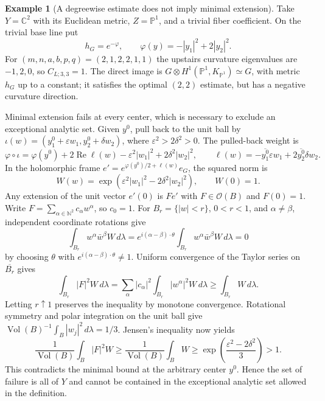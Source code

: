 \documentclass[11pt,reqno]{amsart}
\numberwithin{equation}{section}
\theoremstyle{definition}
\newtheorem{example}[theorem]{Example}
\theoremstyle{remark}
\begin{document}
\begin{example}[A degreewise estimate does not imply minimal extension]
\label{ex:trace-not-mep}
Take $Y=\mathbb C^2$ with its Euclidean metric,
$Z=\mathbb P^1$, and a trivial fiber coefficient.  On the trivial
base line put
\[
 h_G=e^{-\varphi},\qquad
 \varphi(y)=-|y_1|^2+2|y_2|^2.
\]
For $(m,n,a,b,p,q)=(2,1,2,2,1,1)$ the upstairs curvature
eigenvalues are $-1,2,0$, so $C_{L;3,3}=1$.
The direct image is
$G\otimes H^1(\mathbb P^1,K_{\mathbb P^1})\simeq G$,
with metric $h_G$ up to a constant; it satisfies the optimal
$(2,2)$ estimate, but has a negative curvature direction.

Minimal extension fails at every center, which is necessary to
exclude an exceptional analytic set.  Given $y^0$, pull back to
the unit ball by
$\iota(w)=(y^0_1+\varepsilon w_1,y^0_2+\delta w_2)$,
where $\varepsilon^2>2\delta^2>0$.
The pulled-back weight is
\[
 \varphi\circ\iota=\varphi(y^0)+2\operatorname{Re}\ell(w)
        -\varepsilon^2|w_1|^2+2\delta^2|w_2|^2,
 \qquad
 \ell(w)=-\overline{y^0_1}\varepsilon w_1
                      +2\overline{y^0_2}\delta w_2.
\]
In the holomorphic frame
$e'=e^{\varphi(y^0)/2+\ell(w)}e_G$, the squared norm is
\[
 W(w)=\exp(\varepsilon^2|w_1|^2-2\delta^2|w_2|^2),\qquad W(0)=1.
\]
Any extension of the unit vector $e'(0)$ is $F e'$ with
$F\in\mathcal O(B)$ and $F(0)=1$.  Write
$F=\sum_{\alpha\in\mathbb N^2}c_\alpha w^\alpha$, so $c_0=1$.
For $B_r=\{|w|<r\}$, $0<r<1$, and $\alpha\ne\beta$,
independent coordinate rotations give
\[
 \int_{B_r}w^\alpha\bar w^\beta W\,d\lambda
   =e^{i(\alpha-\beta)\cdot\theta}
           \int_{B_r}w^\alpha\bar w^\beta W\,d\lambda=0
\]
by choosing $\theta$ with $e^{i(\alpha-\beta)\cdot\theta}\ne1$.
Uniform convergence of the Taylor series on $\overline{B_r}$ gives
\[
 \int_{B_r}|F|^2W\,d\lambda
   =\sum_\alpha|c_\alpha|^2\int_{B_r}|w^\alpha|^2W\,d\lambda
   \ge\int_{B_r}W\,d\lambda.
\]
Letting $r\uparrow1$ preserves the inequality by monotone convergence.
Rotational symmetry and polar integration on the unit ball give
$\operatorname{Vol}(B)^{-1}\int_B|w_j|^2\,d\lambda=1/3$.
Jensen's inequality now yields
\[
 \frac1{\operatorname{Vol}(B)}\int_B|F|^2W
 \ge\frac1{\operatorname{Vol}(B)}\int_BW
 \ge\exp\!\left(\frac{\varepsilon^2-2\delta^2}{3}\right)>1.
\]
This contradicts the minimal bound at the arbitrary center $y^0$.
Hence the set of failure is all of $Y$ and cannot be contained in
the exceptional analytic set allowed in the definition.
\end{example}
\end{document}
